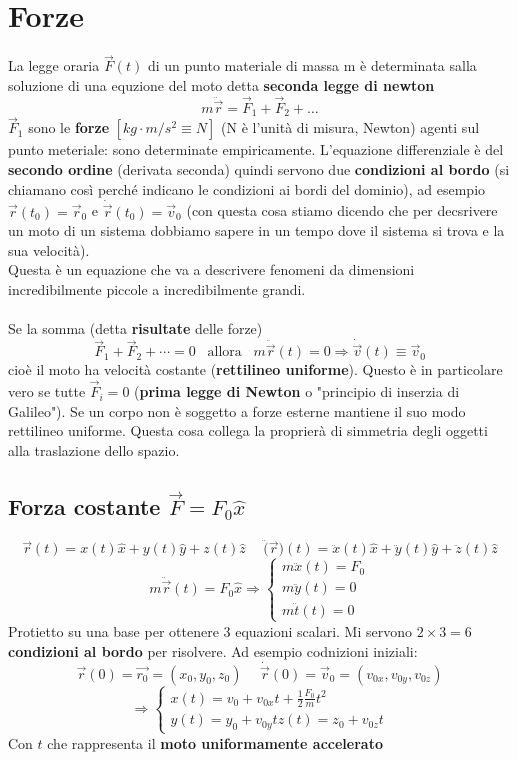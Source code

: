 \newpage
\section{Forze}
La legge oraria $\vec{F}(t)$ di un punto materiale di massa m è determinata salla soluzione di una equzione
del moto detta \textbf{seconda legge di newton}
$$m\ddot{\vec{r}} = \vec{F}_1 + \vec{F}_2 + \dots$$
$\vec{F}_1$ sono le \textbf{forze} $[kg \cdot m/s^2 \equiv N]$ (N è l'unità di misura, Newton) agenti sul punto meteriale: sono determinate empiricamente.
L'equazione differenziale è del \textbf{secondo ordine} (derivata seconda) quindi servono due \textbf{condizioni al bordo} (si chiamano così perché indicano le 
condizioni ai bordi del dominio), ad esempio $\vec{r}(t_0) = \vec{r}_0$ e $\dot{\vec{r}}(t_0) = \vec{v}_0$ (con questa cosa stiamo dicendo che per decsrivere un moto di un sistema
dobbiamo sapere in un tempo dove il sistema si trova e la sua velocità).\\
Questa è un equazione che va a descrivere fenomeni da dimensioni incredibilmente piccole a incredibilmente grandi.\\\\
Se la somma (detta \textbf{risultate} delle forze)
$$\vec{F}_1 + \vec{F}_2 + \cdots = 0 \hspace{10pt}\text{allora}\hspace{10pt} m\ddot{\vec{r}}(t) = 0 \Rightarrow \dot{\vec{v}}(t) \equiv \vec{v}_0$$
cioè il moto ha velocità costante (\textbf{rettilineo uniforme}). Questo è in particolare vero se tutte $\vec{F}_i = 0$ 
(\textbf{prima legge di Newton} o "principio di inserzia di Galileo"). Se un corpo non è soggetto a forze esterne mantiene il suo modo rettilineo uniforme.
Questa cosa collega la proprierà di simmetria degli oggetti alla traslazione dello spazio.

\subsection{Forza costante $\vec{F} = F_0\hat{x}$}
$$\vec{r}(t) = x(t)\hat{x} + y(t)\hat{y} + z(t)\hat{z} \hspace{15pt}\ddot(\vec{r})(t) = \ddot{x}(t)\hat{x} + \ddot{y}(t)\hat{y} + \ddot{z}(t)\hat{z}$$
$$m\ddot{\vec{r}}(t) = F_0 \hat{x} \Rightarrow 
\begin{cases}
    m\ddot{x}(t) = F_0\\
    m\ddot{y}(t) = 0\\
    m\ddot{t}(t) = 0 
\end{cases}
$$
Protietto su una base per ottenere 3 equazioni scalari. Mi servono $2 \times 3 = 6$ \textbf{condizioni al bordo} per risolvere.
Ad esempio codnizioni iniziali:
$$\vec{r}(0) = \vec{r_0} = (x_0, y_0, z_0) \hspace{15pt} \dot{\vec{r}}(0) = \vec{v}_0 = (v_{0x}, v_{0y}, v_{0z})$$
$$\Rightarrow 
\begin{cases}
    x(t) = v_0 + v_{0x}t + \frac{1}{2}\frac{F_0}{m}t^2\\
    y(t) = y_0 + v_{0y}t
    z(t) = z_0 + v_{0z}t
\end{cases}
$$
Con $t$ che rappresenta il \textbf{moto uniformamente accelerato}

